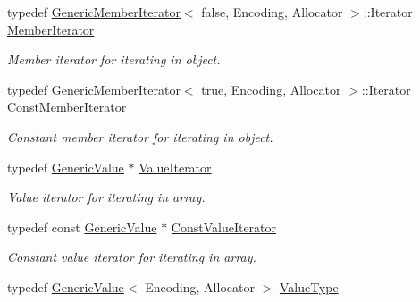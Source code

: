 \begin{DoxyCompactItemize}
\mbox{\label{class_generic_value_a349b8faae61edc42b4289726820be439}} 
typedef \hyperlink{class_generic_member_iterator}{Generic\+Member\+Iterator}$<$ false, Encoding, Allocator $>$\+::Iterator \hyperlink{class_generic_value_a349b8faae61edc42b4289726820be439}{Member\+Iterator}
\begin{DoxyCompactList}\small\item\em Member iterator for iterating in object. \end{DoxyCompactList}\item 
\mbox{\label{class_generic_value_aac08c3e660a9036d3dcb8b10ff6c61f4}} 
typedef \hyperlink{class_generic_member_iterator}{Generic\+Member\+Iterator}$<$ true, Encoding, Allocator $>$\+::Iterator \hyperlink{class_generic_value_aac08c3e660a9036d3dcb8b10ff6c61f4}{Const\+Member\+Iterator}
\begin{DoxyCompactList}\small\item\em Constant member iterator for iterating in object. \end{DoxyCompactList}\item 
\mbox{\label{class_generic_value_aee30721a49688ba0f865f5d581eb6be9}} 
typedef \hyperlink{class_generic_value}{Generic\+Value} $\ast$ \hyperlink{class_generic_value_aee30721a49688ba0f865f5d581eb6be9}{Value\+Iterator}
\begin{DoxyCompactList}\small\item\em Value iterator for iterating in array. \end{DoxyCompactList}\item 
\mbox{\label{class_generic_value_a49010c6d6886f96ff0b0c51bccc7f6ea}} 
typedef const \hyperlink{class_generic_value}{Generic\+Value} $\ast$ \hyperlink{class_generic_value_a49010c6d6886f96ff0b0c51bccc7f6ea}{Const\+Value\+Iterator}
\begin{DoxyCompactList}\small\item\em Constant value iterator for iterating in array. \end{DoxyCompactList}\item 
\mbox{\label{class_generic_value_a43a39bb4fca9b9d3de3da6ac353d25ce}} 
typedef \hyperlink{class_generic_value}{Generic\+Value}$<$ Encoding, Allocator $>$ \hyperlink{class_generic_value_a43a39bb4fca9b9d3de3da6ac353d25ce}{Value\+Type}

\end{DoxyCompactItemize}
